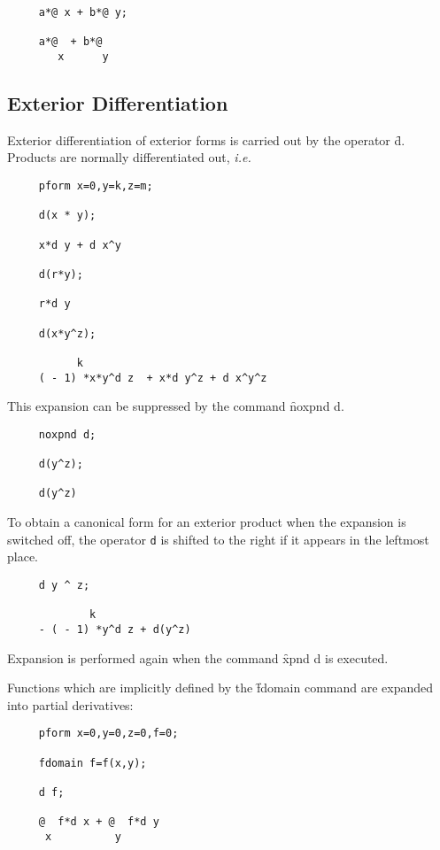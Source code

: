 \example{}

\begin{verbatim}
     a*@ x + b*@ y;

     a*@  + b*@
        x      y
\end{verbatim}

\subsection{Exterior Differentiation}
Exterior differentiation of exterior forms is carried out by the
operator \f{d}\label{d}.  Products are normally differentiated out,
\emph{i.e.}
\begin{verbatim}
     pform x=0,y=k,z=m;

     d(x * y);

     x*d y + d x^y

     d(r*y);

     r*d y

     d(x*y^z);

           k
     ( - 1) *x*y^d z  + x*d y^z + d x^y^z
\end{verbatim}

This expansion can be suppressed by the command \f{noxpnd d}\label{NOXPNDD}.
\hypertarget{command:NOXPND}{}

\begin{verbatim}
     noxpnd d;

     d(y^z);

     d(y^z)
\end{verbatim}

To obtain a canonical form for an exterior product when the expansion
is switched off, the operator \texttt{d} is shifted to the right if it
appears in the leftmost place.

\begin{verbatim}
     d y ^ z;

             k
     - ( - 1) *y^d z + d(y^z)
\end{verbatim}

Expansion is performed again when the command \f{xpnd d}\label{XPNDD}
is executed. \hypertarget{command:XPND}{}

Functions which are implicitly defined by the \f{fdomain} command are
expanded into partial derivatives:

\begin{verbatim}
     pform x=0,y=0,z=0,f=0;

     fdomain f=f(x,y);

     d f;

     @  f*d x + @  f*d y
      x          y
\end{verbatim}

